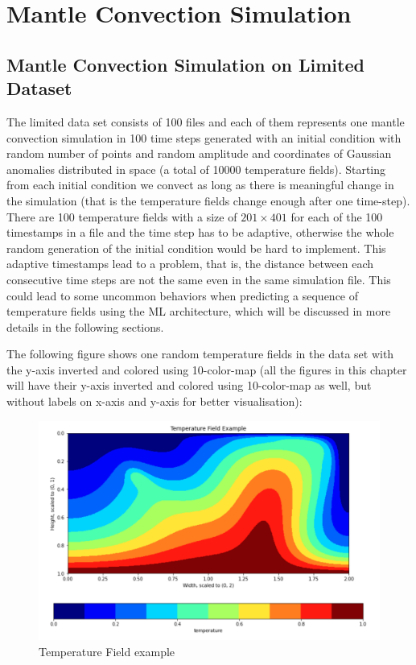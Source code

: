 \chapter{Mantle Convection Simulation}\label{chap:evaluation}

\section{Mantle Convection Simulation on Limited Dataset}

The limited data set consists of 100 files and each of them represents one mantle convection simulation in 100 time steps generated with an initial condition with random number of points and random amplitude and coordinates of Gaussian anomalies distributed in space (a total of 10000 temperature fields). Starting from each initial condition we convect as long as there is meaningful change in the simulation (that is the temperature fields change enough after one time-step). There are 100 temperature fields with a size of $201 \times 401$ for each of the 100 timestamps in a file and the time step has to be adaptive, otherwise the whole random generation of the initial condition would be hard to implement. This adaptive timestamps lead to a problem, that is, the distance between each consecutive time steps are not the same even in the same simulation file. This could lead to some uncommon behaviors when predicting a sequence of temperature fields using the ML architecture, which will be discussed in more details in the following sections.

The following figure shows one random temperature fields in the data set with the y-axis inverted and colored using 10-color-map (all the figures in this chapter will have their y-axis inverted and colored using 10-color-map as well, but without labels on x-axis and y-axis for better visualisation):

\begin{figure}[H]
    \caption{Temperature Field example}
    \includegraphics[scale=0.6]{figures/mantle_convection_images/temperature_field_example.png}
\end{figure}

